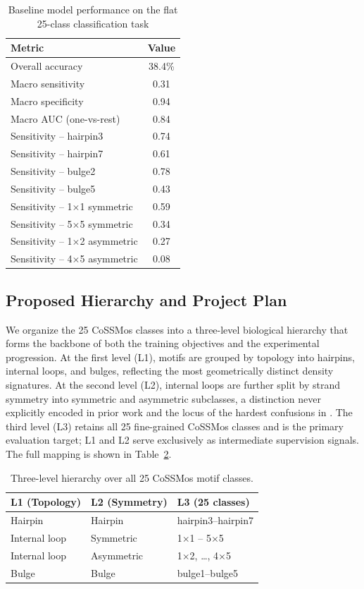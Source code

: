 \documentclass[sigconf]{acmart}
\begin{document}
\begin{table}[h]
\caption{Baseline model performance on the flat 25-class
classification task}
\label{tab:baseline_results}
\centering
\begin{tabular}{lc}
\toprule
Metric & Value \\
\midrule
Overall accuracy         & 38.4\% \\
Macro sensitivity        & 0.31 \\
Macro specificity        & 0.94 \\
Macro AUC (one-vs-rest)  & 0.84 \\
\midrule
Sensitivity -- hairpin3  & 0.74 \\
Sensitivity -- hairpin7  & 0.61 \\
Sensitivity -- bulge2    & 0.78 \\
Sensitivity -- bulge5    & 0.43 \\
Sensitivity -- 1$\times$1 symmetric & 0.59 \\
Sensitivity -- 5$\times$5 symmetric & 0.34 \\
Sensitivity -- 1$\times$2 asymmetric & 0.27 \\
Sensitivity -- 4$\times$5 asymmetric & 0.08 \\
\bottomrule
\end{tabular}
\end{table}
 
\subsection{Proposed Hierarchy and Project Plan}
 
We organize the 25 CoSSMos classes into a three-level biological
hierarchy that forms the backbone of both the training objectives
and the experimental progression. At the first level (L1), motifs
are grouped by topology into hairpins, internal loops, and bulges,
reflecting the most geometrically distinct density signatures. At
the second level (L2), internal loops are further split by strand
symmetry into symmetric and asymmetric subclasses, a distinction
never explicitly encoded in prior work and the locus of the hardest
confusions in \cite{mbaku2025}. The third level (L3) retains all
25 fine-grained CoSSMos classes and is the primary evaluation
target; L1 and L2 serve exclusively as intermediate supervision
signals. The full mapping is shown in Table~\ref{tab:hierarchy}.
 
\begin{table}[h]
\caption{Three-level hierarchy over all 25 CoSSMos motif classes.}
\label{tab:hierarchy}
\centering
\begin{tabular}{lll}
\toprule
L1 (Topology) & L2 (Symmetry) & L3 (25 classes) \\
\midrule
Hairpin       & Hairpin        & hairpin3--hairpin7 \\
Internal loop & Symmetric      & 1$\times$1 -- 5$\times$5 \\
Internal loop & Asymmetric     & 1$\times$2, \ldots, 4$\times$5 \\
Bulge         & Bulge          & bulge1--bulge5 \\
\bottomrule
\end{tabular}
\end{table}
 
\end{document}
